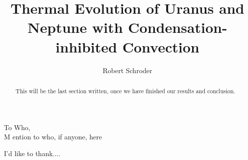 \documentclass[11pt]{ucscthesisbs}
\begin{document}

\title{Thermal Evolution of Uranus and Neptune with Condensation-inhibited Convection}
\author{Robert Schroder}
%

%





\maketitle
\copyrightpage

\begin{frontmatter}

\begin{abstract}
This will be the last section written, once we have finished our results and conclusion.
\end{abstract}

\tableofcontents
%
%
\listoffigures
\listoftables

\begin{dedication}
\null\vfil
{\large
\begin{center}
To Who,\\\vspace{12pt}
M  ention to who, if anyone, here
\end{center}}
\vfil\null
\end{dedication}

\begin{acknowledgements}
I'd like to thank....
\end{acknowledgements}


\end{frontmatter}

\end{document}
